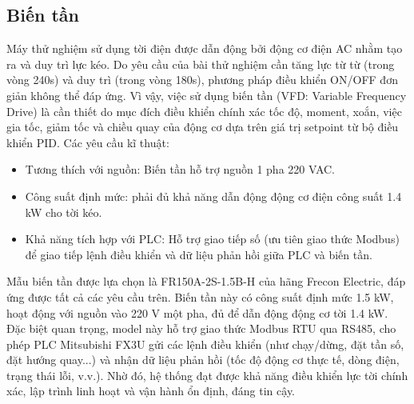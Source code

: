           \subsection{Biến tần}
               \hspace*{0.6cm}Máy thử nghiệm sử dụng tời điện được dẫn động bởi động cơ điện AC nhằm tạo ra và duy trì lực kéo. Do yêu cầu của bài thử nghiệm cần tăng lực từ từ (trong vòng 240s) và duy trì (trong vòng 180s), phương pháp điều khiển ON/OFF đơn giản không thể đáp ứng. Vì vậy, việc sử dụng biến tần (VFD: Variable Frequency Drive) là cần thiết do mục đích điều khiển chính xác tốc độ, moment, xoắn, việc gia tốc, giảm tốc và chiều quay của động cơ dựa trên giá trị setpoint từ bộ điều khiển PID.
               \newline
               \hspace*{0.6cm}Các yêu cầu kĩ thuật:
               \begin{itemize}
                    \item Tương thích với nguồn: Biến tần hỗ trợ nguồn 1 pha 220 VAC.
                    \item Công suất định mức: phải đủ khả năng dẫn động động cơ điện công suất 1.4 kW cho tời kéo. 
                    \item Khả năng tích hợp với PLC: Hỗ trợ giao tiếp số (ưu tiên giao thức Modbus) để giao tiếp lệnh điều khiển và dữ liệu phản hồi giữa PLC và biến tần.                 
               \end{itemize}                
               \hspace*{0.6cm}Mẫu biến tần được lựa chọn là FR150A-2S-1.5B-H của hãng Frecon Electric, đáp ứng được tất cả các yêu cầu trên. Biến tần này có công suất định mức 1.5 kW, hoạt động với nguồn vào 220 V một pha, đủ để dẫn động động cơ tời 1.4 kW.
               Đặc biệt quan trọng, model này hỗ trợ giao thức Modbus RTU qua RS485, cho phép PLC Mitsubishi FX3U gửi các lệnh điều khiển (như chạy/dừng, đặt tần số, đặt hướng quay...) và nhận dữ liệu phản hồi (tốc độ động cơ thực tế, dòng điện, trạng thái lỗi, v.v.).
               Nhờ đó, hệ thống đạt được khả năng điều khiển lực tời chính xác, lập trình linh hoạt và vận hành ổn định, đáng tin cậy.
